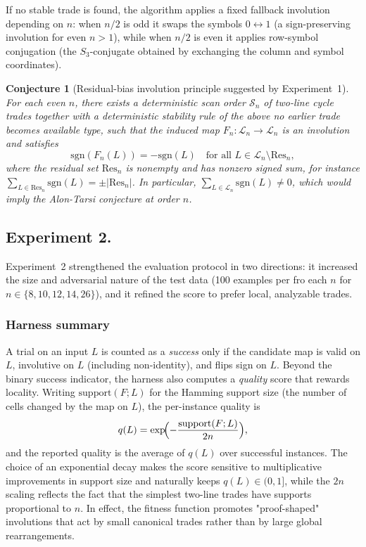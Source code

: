 \documentclass[11pt]{amsart}
\newtheorem{conjecture}{Conjecture}
\newcommand{\sgn}{\mathrm{sgn}}
\newcommand{\Res}{\mathrm{Res}}
\begin{document}
If no stable trade is found, the algorithm applies a fixed fallback involution depending on $n$:
when $n/2$ is odd it swaps the symbols $0\leftrightarrow 1$ (a sign-preserving involution for even $n>1$), while when $n/2$ is even it applies row-symbol conjugation (the $S_3$-conjugate obtained by exchanging the column and symbol coordinates).

\begin{conjecture}[Residual-bias involution principle suggested by Experiment~1]
For each even $n$, there exists a deterministic scan order $\mathcal{S}_n$ of two-line cycle trades together with a deterministic stability rule of the above no earlier trade becomes available type, such that the induced map $F_n:\mathcal{L}_n\to\mathcal{L}_n$ is an involution and satisfies
\[
\sgn(F_n(L))=-\sgn(L)\quad\text{for all }L\in\mathcal{L}_n\setminus\Res_n,
\]
where the residual set $\Res_n$ is nonempty and has nonzero signed sum, for instance $\sum_{L\in\Res_n}\sgn(L)=\pm|\Res_n|$.
In particular, $\sum_{L\in\mathcal{L}_n}\sgn(L)\neq 0$, which would imply the Alon-Tarsi conjecture at order $n$.
\end{conjecture}

\subsection{Experiment 2.}
Experiment~2 strengthened the evaluation protocol in two directions: it increased the size and adversarial nature of the test data (100 examples per fro each $n$ for $n\in\{8,10,12,14,26\}$), and it refined the score to prefer local, analyzable trades.
\subsubsection{Harness summary}
A trial on an input $L$ is counted as a \emph{success} only if the candidate map is valid on $L$, involutive on $L$ (including non-identity), and flips sign on $L$.
Beyond the binary success indicator, the harness also computes a \emph{quality} score that rewards locality.
Writing $\mathrm{support}(F;L)$ for the Hamming support size (the number of cells changed by the map on $L$), the per-instance quality is
\[
q(L)=\exp\!\Bigl(-\frac{\mathrm{support}(F;L)}{2n}\Bigr),
\]
and the reported quality is the average of $q(L)$ over successful instances.
The choice of an exponential decay makes the score sensitive to multiplicative improvements in support size and naturally keeps $q(L)\in(0,1]$, while the $2n$ scaling reflects the fact that the simplest two-line trades have supports proportional to $n$.
In effect, the fitness function promotes "proof-shaped" involutions that act by small canonical trades rather than by large global rearrangements.
\end{document}
